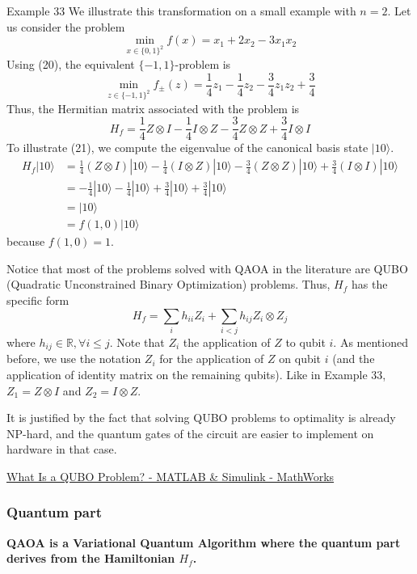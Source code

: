 \begin{example}
    Example 33 We illustrate this transformation on a small example with $n=2$. Let us consider the problem
$$
\min _{x \in\{0,1\}^{2}} f(x)=x_{1}+2 x_{2}-3 x_{1} x_{2}
$$
Using (20), the equivalent $\{-1,1\}$-problem is
$$
\min _{z \in\{-1,1\}^{2}} f_{ \pm}(z)=\frac{1}{4} z_{1}-\frac{1}{4} z_{2}-\frac{3}{4} z_{1} z_{2}+\frac{3}{4}
$$
Thus, the Hermitian matrix associated with the problem is
$$
H_{f}=\frac{1}{4} Z \otimes I-\frac{1}{4} I \otimes Z-\frac{3}{4} Z \otimes Z+\frac{3}{4} I \otimes I
$$
To illustrate (21), we compute the eigenvalue of the canonical basis state $|10\rangle$.
$$
\begin{aligned}
H_{f}|10\rangle & =\frac{1}{4}(Z \otimes I)|10\rangle-\frac{1}{4}(I \otimes Z)|10\rangle-\frac{3}{4}(Z \otimes Z)|10\rangle+\frac{3}{4}(I \otimes I)|10\rangle \\
& =-\frac{1}{4}|10\rangle-\frac{1}{4}|10\rangle+\frac{3}{4}|10\rangle+\frac{3}{4}|10\rangle \\
& =|10\rangle \\
& =f(1,0)|10\rangle
\end{aligned}
$$
because $f(1,0)=1$.
\end{example}

Notice that most of the problems solved with QAOA in the literature are QUBO (Quadratic Unconstrained Binary Optimization) problems. Thus, $H_{f}$ has the specific form
$$
H_{f}=\sum_{i} h_{i i} Z_{i}+\sum_{i<j} h_{i j} Z_{i} \otimes Z_{j}
$$
where $h_{i j} \in \mathbb{R}, \forall i \leq j$. Note that $Z_{i}$ the application of $Z$ to qubit $i$. As mentioned before, we use the notation $Z_{i}$ for the application of $Z$ on qubit $i$ (and the application of identity matrix on the remaining qubits). Like in Example 33, $Z_1=Z \otimes I$ and $Z_2=I \otimes Z$.


It is justified by the fact that solving QUBO problems to optimality is already NP-hard, and the quantum gates of the circuit are easier to implement on hardware in that case.

\href{https://ww2.mathworks.cn/help/matlab/math/what-is-a-qubo.html}{What Is a QUBO Problem? - MATLAB \& Simulink - MathWorks} 

\subsubsection{Quantum part}

\textbf{QAOA is a Variational Quantum Algorithm where the quantum part derives from the Hamiltonian $H_{f}$. }

